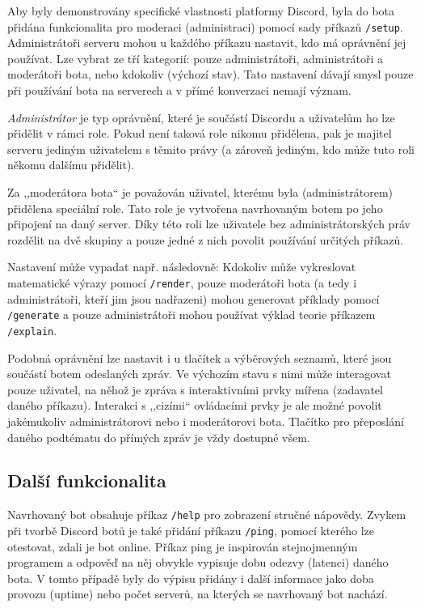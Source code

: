 \documentclass[FM]{tulthesis}
\begin{document}
	Aby byly demonstrovány specifické vlastnosti platformy Discord, byla do bota přidána funkcionalita pro moderaci (administraci) pomocí sady příkazů \verb*|/setup|. Administrátoři serveru mohou u každého příkazu nastavit, kdo má oprávnění jej používat. Lze vybrat ze tří kategorií: pouze administrátoři, administrátoři a moderátoři bota, nebo kdokoliv (výchozí stav). Tato nastavení dávají smysl pouze při používání bota na serverech a v přímé konverzaci nemají význam.
	
	\textit{Administrátor} je typ oprávnění, které je součástí Discordu a uživatelům ho lze přidělit v rámci role. Pokud není taková role nikomu přidělena, pak je majitel serveru jediným uživatelem s těmito právy (a zároveň jediným, kdo může tuto roli někomu dalšímu přidělit).
	
	Za ,,moderátora bota`` je považován uživatel, kterému byla (administrátorem) přidělena speciální role. Tato role je vytvořena navrhovaným botem po jeho připojení na daný server. Díky této roli lze uživatele bez administrátorských práv rozdělit na dvě skupiny a pouze jedné z nich povolit používání určitých příkazů.
	
	Nastavení může vypadat např. následovně: Kdokoliv může vykreslovat matematické výrazy pomocí \verb*|/render|, pouze moderátoři bota (a tedy i administrátoři, kteří jim jsou nadřazeni) mohou generovat příklady pomocí \verb*|/generate| a pouze administrátoři mohou používat výklad teorie příkazem \verb*|/explain|.
	
	Podobná oprávnění lze nastavit i u tlačítek a výběrových seznamů, které jsou součástí botem odeslaných zpráv. Ve výchozím stavu s nimi může interagovat pouze uživatel, na něhož je zpráva s interaktivními prvky mířena (zadavatel daného příkazu). Interakci s ,,cizími`` ovládacími prvky je ale možné povolit jakémukoliv administrátorovi nebo i moderátorovi bota. Tlačítko pro přeposlání daného podtématu do přímých zpráv je vždy dostupné všem.
	
	\subsection{Další funkcionalita} %
	
	Navrhovaný bot obsahuje příkaz \verb*|/help| pro zobrazení stručné nápovědy. Zvykem při tvorbě Discord botů je také přidání příkazu \verb*|/ping|, pomocí kterého lze otestovat, zdali je bot online. Příkaz ping je inspirován stejnojmenným programem a odpověď na něj obvykle vypisuje dobu odezvy (latenci) daného bota. V tomto případě byly do výpisu přidány i další informace jako doba provozu (uptime) nebo počet serverů, na kterých se navrhovaný bot nachází.
	
\end{document}
